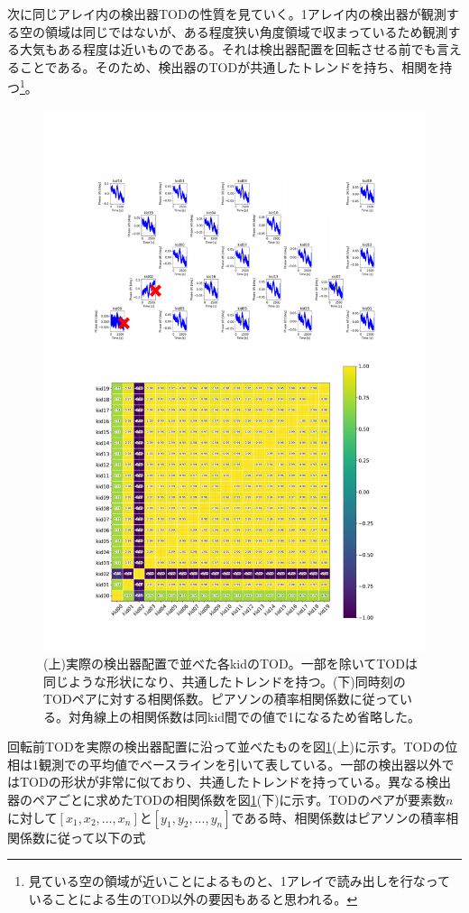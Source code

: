 次に同じアレイ内の検出器TODの性質を見ていく。1アレイ内の検出器が観測する空の領域は同じではないが、ある程度狭い角度領域で収まっているため観測する大気もある程度は近いものである。それは検出器配置を回転させる前でも言えることである。そのため、検出器のTODが共通したトレンドを持ち、相関を持つ\footnote{見ている空の領域が近いことによるものと、1アレイで読み出しを行なっていることによる生のTOD以外の要因もあると思われる。}。
\begin{figure}[htbp]
  \centering
  \includegraphics[width=1.0\columnwidth]{5_alignment/figs/9011_tod_cor_combined.pdf}
  \caption{(上)実際の検出器配置で並べた各kidのTOD。一部を除いてTODは同じような形状になり、共通したトレンドを持つ。(下)同時刻のTODペアに対する相関係数。ピアソンの積率相関係数に従っている。対角線上の相関係数は同kid間での値で1になるため省略した。}
  \label{9011_tod_cor_combined}
\end{figure}
回転前TODを実際の検出器配置に沿って並べたものを図\ref{9011_tod_cor_combined}(上)に示す。TODの位相は1観測での平均値でベースラインを引いて表している。一部の検出器以外ではTODの形状が非常に似ており、共通したトレンドを持っている。異なる検出器のペアごとに求めたTODの相関係数を図\ref{9011_tod_cor_combined}(下)に示す。TODのペアが要素数$n$に対して$[x_{1},x_{2}, ..., x_{n}]$と$[y_{1},y_{2}, ..., y_{n}]$である時、相関係数はピアソンの積率相関係数に従って以下の式
